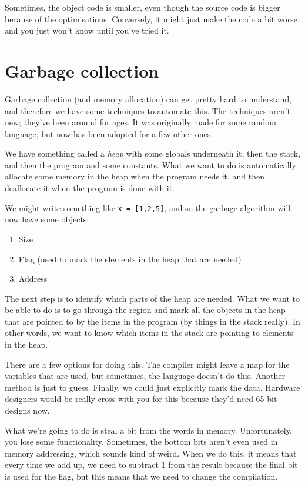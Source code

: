 \documentclass[11pt,a4paper,titlepage,dvipsnames,cmyk]{scrartcl}
\begin{document}
Sometimes, the object code is smaller, even though the source code is
bigger because of the optimisations. Conversely, it might just make the
code a bit worse, and you just won't know until you've tried it.

\section{Garbage collection}%
\label{sec:garbage-collection}

Garbage collection (and memory allocation) can get pretty hard to
understand, and therefore we have some techniques to automate this. The
techniques aren't new; they've been around for ages. It was originally
made for some random language, but now has been adopted for a few other
ones.

We have something called a \textit{heap} with some globals underneath it,
then the stack, and then the program and some constants. What we want to
do is automatically allocate some memory in the heap when the program
needs it, and then deallocate it when the program is done with it.

We might write something like \lstinline|x = [1,2,5]|, and so the garbage
algorithm will now have some objects:

\begin{enumerate}
    \item Size
    \item Flag (used to mark the elements in the heap that are
        needed)
    \item Address
\end{enumerate}

The next step is to identify which parts of the heap are needed. What we
want to be able to do is to go through the region and mark all the objects
in the heap that are pointed to by the items in the program (by things in
the stack really). In other words, we want to know which items in the
stack are pointing to elements in the heap.

There are a few options for doing this. The compiler might leave a map for
the variables that are used, but sometimes, the language doesn't do this.
Another method is just to guess. Finally, we could just explicitly mark
the data. Hardware designers would be really cross with you for this
because they'd need 65-bit designs now.

What we're going to do is steal a bit from the words in memory.
Unfortunately, you lose some functionality. Sometimes, the bottom bits
aren't even used in memory addressing, which sounds kind of weird.  When
we do this, it means that every time we add up, we need to subtract 1 from
the result because the final bit is used for the flag, but this means that
we need to change the compilation.
\end{document}
